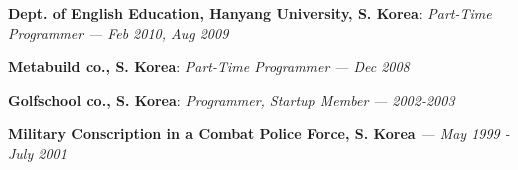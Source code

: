 {\bf Dept. of English Education, Hanyang University, S. Korea}: \emph{Part-Time Programmer}
{\it \footnotesize --- Feb 2010, Aug 2009}
\vspace{-0.15in}

{\bf Metabuild co., S. Korea}: \emph{Part-Time Programmer}
{\it \footnotesize --- Dec 2008}
\vspace{-0.15in}

{\bf Golfschool co., S. Korea}: \emph{Programmer, Startup Member}
{\it \footnotesize --- 2002-2003}
\vspace{-0.15in}

{\bf Military Conscription in a Combat Police Force, S. Korea}
{\it \footnotesize --- May 1999 - July 2001}

